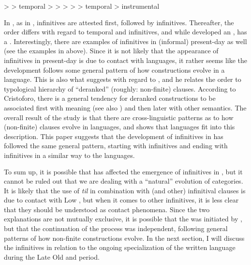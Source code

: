 \documentclass[output=paper]{langscibook}
\begin{document}
\ea
\label{ex:kalm:31}
 >  > temporal >  > 
\ex
\label{ex:kalm:32}
 >  >  > temporal > instrumental
\z

In , as in ,  infinitives are attested first, followed by  infinitives. Thereafter, the order differs with regard to temporal and  infinitives, and while  developed an ,  has a . Interestingly, there are examples of  infinitives in (informal) present-day  as well (see the examples in  above). Since it is not likely that the appearance of  infinitives in present-day  is due to contact with  languages, it rather seems like the development follows some general pattern of how  constructions evolve in a language. This is also what \citet{Schulte2007Prepositional, Schulte2007What} suggests with regard to , and he relates the order to  typological hierarchy of “deranked” (roughly: non-finite)  clauses. According to Cristoforo, there is a general tendency for deranked constructions to be associated first with  meaning (see also \citealt{Haspelmath1989}) and then later with other semantics. The overall result of the study is that there are cross-linguistic patterns as to how  (non-finite) clauses evolve in languages, and \citet{Schulte2007Prepositional, Schulte2007What} shows that  languages fit into this description. This paper suggests that the development of  infinitives in  has followed the same general pattern, starting with  infinitives and ending with  infinitives in a similar way to the  languages.



To sum up, it is possible that  has affected the emergence of  infinitives in , but it cannot be ruled out that we are dealing with a “natural” evolution of  categories. It is likely that the use of \textit{til} in combination with  (and other) infinitival clauses is due to contact with Low , but when it comes to other  infinitives, it is less clear that they should be understood as contact phenomena. Since the two explanations are not mutually exclusive, it is possible that the  was initiated by , but that the continuation of the process was independent, following general patterns of how  non-finite constructions evolve. In the next section, I will discuss the  infinitives in relation to the ongoing specialization of the written language during the Late Old and  period. 
\end{document}
